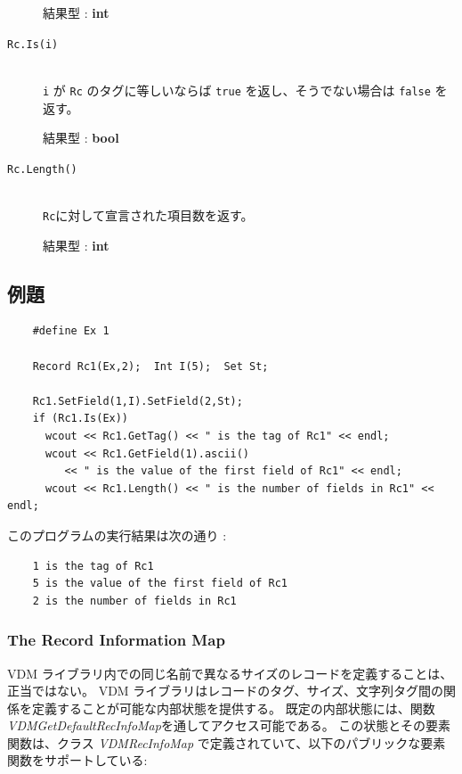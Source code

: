 \documentclass[\pformat,12pt]{jarticle}
\begin{document}
\begin{description}
     結果型 : {\bf int}

\item[{\tt Rc.Is(i)}] \mbox{}\\
      {\tt i} が {\tt Rc} のタグに等しいならば {\tt true} を返し、そうでない場合は {\tt false} を返す。

     結果型 : {\bf bool}

\item[{\tt Rc.Length()}] \mbox{}\\
   {\tt Rc}に対して宣言された項目数を返す。

     結果型 : {\bf int}
     
\end{description}

\subsection*{例題}

\begin{verbatim}
    #define Ex 1
    
    Record Rc1(Ex,2);  Int I(5);  Set St;

    Rc1.SetField(1,I).SetField(2,St);
    if (Rc1.Is(Ex))
      wcout << Rc1.GetTag() << " is the tag of Rc1" << endl;
      wcout << Rc1.GetField(1).ascii() 
         << " is the value of the first field of Rc1" << endl;
      wcout << Rc1.Length() << " is the number of fields in Rc1" << endl;
\end{verbatim}

\noindent このプログラムの実行結果は次の通り :

\begin{verbatim}
    1 is the tag of Rc1
    5 is the value of the first field of Rc1
    2 is the number of fields in Rc1
\end{verbatim}


\subsubsection{The Record Information Map} \label{The Record Information Map}

VDM ライブラリ内での同じ名前で異なるサイズのレコードを定義することは、正当ではない。
VDM ライブラリはレコードのタグ、サイズ、文字列タグ間の関係を定義することが可能な内部状態を提供する。
既定の内部状態には、関数 {\em VDMGetDefaultRecInfoMap}を通してアクセス可能である。 
この状態とその要素関数は、クラス {\em VDMRecInfoMap} で定義されていて、以下のパブリックな要素関数をサポートしている:
\end{document}
